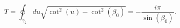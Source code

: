 \begin{equation}
  T = \oint_{\gamma_2} du \sqrt{\cot^2(u)-\cot^2(\beta_0)}  = 
    -\frac{i\pi}{\sin(\beta_0)}.
\end{equation}


